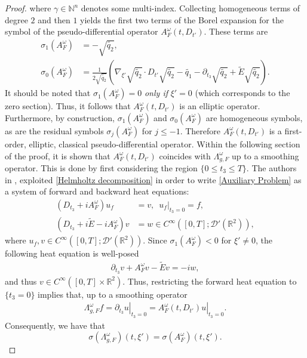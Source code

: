 \documentclass[12pt,a4paper]{amsart}
\numberwithin{equation}{section}
\theoremstyle{plain}
\theoremstyle{definition}
\begin{document}
\begin{proof}
		where $\gamma\in \mathbb{N}^n$ denotes some multi-index. Collecting homogeneous terms of degree $2$ and then $1$ yields the first two terms of the Borel expansion for the symbol of the pseudo-differential operator $A^\omega_F(t,D_{t'})$. These terms are 
    \begin{align*}
			\sigma_1(A^\omega_F) &= -\sqrt{\widetilde{q_2}}, \\
			\sigma_0(A^\omega_F) &= \frac{1}{2\sqrt{\widetilde{q_2}}}(\nabla_{\xi'}\sqrt{\widetilde{q_2}}\cdot D_{t'}\sqrt{\widetilde{q_2}}-\widetilde{q_1}-\partial_{t_3}\sqrt{\widetilde{q_2}} +\widetilde{E}\sqrt{\widetilde{q_2}}).
    \end{align*}
    It should be noted that $\sigma_1(A^\omega_F)=0$ \textit{only if} $\xi'=0$ (which corresponds to the zero section). Thus, it follows that $A^\omega_F(t,D_{t'})$ is an elliptic operator. Furthermore, by construction, $\sigma_1(A^\omega_F)$ and $\sigma_0(A^\omega_F)$ are homogeneous symbols, as are the residual symbols $\sigma_{j}(A^\omega_F)$ for $j\leq-1$. Therefore $A^\omega_F(t,D_{t'})$ is a first-order, elliptic, classical pseudo-differential operator. Within the following section of the proof, it is shown that $A^\omega_F(t,D_{t'})$ coincides with $\Lambda_{g,F}^\omega$ up to a smoothing operator. This is done by first considering the region $\{0\leq t_3\leq T\}$. The authors in \cite{LeeUhlmann89}, exploited \eqref{Helmholtz decomposition} in order to write \eqref{Auxiliary Problem} as a system of forward and backward heat equations:
    \begin{align*}
			(D_{t_3}+iA^\omega_F)u_f &= v, \;\ \left.u_f\right\vert_{t_3=0}=f, \\
			(D_{t_3}+i\widetilde{E}-iA^\omega_F)v &= w\in C^\infty([0,T];\mathcal{D}'(\mathbb{R}^2)),
    \end{align*}
    where $u_f,v\in C^\infty([0,T];\mathcal{D}'(\mathbb{R}^{2}))$. Since $\sigma_1(A^\omega_F) < 0$ for $\xi'\neq 0$, the following heat equation is well-posed 
		\begin{align*}
			\partial_{t_3}v+A^\omega_Fv-\widetilde{E}v = -iw,
		\end{align*}
		and thus $v\in C^\infty([0,T]\times \mathbb{R}^{2})$. Thus, restricting the forward heat equation to $\{t_3 = 0\}$ implies that, up to a smoothing operator
		\begin{align*}
			\Lambda_{g,F}^\omega f = \left.\partial_{t_3} u\right\vert_{t_3=0} = \left.A_F^\omega(t,D_{t'}) u \right\vert_{t_3=0}. 
		\end{align*} 
    Consequently, we have that  
    $$\sigma(\Lambda_{g,F}^\omega)(t,\xi') = \sigma(A^\omega_F)(t,\xi').$$
\end{proof}
\end{document}
